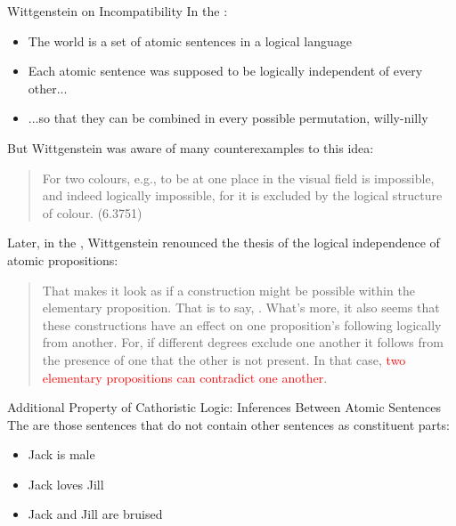 \begin{frame}{Wittgenstein on Incompatibility}
In the :
\begin{itemize}
\item
The world is a set of atomic sentences in a logical language
\item
Each atomic sentence was supposed to be logically independent of every other...
\item
...so that they can be combined in every possible permutation, willy-nilly
\end{itemize}
\end{frame}

\begin{frame}
But Wittgenstein was aware of many counterexamples to this idea:
\begin{quote}
For two colours, e.g., to be at one place in the visual field is impossible, and indeed logically impossible, for it is excluded by the logical structure of colour. (6.3751)
\end{quote}
\end{frame}

\begin{frame}
Later, in the , Wittgenstein renounced the thesis of the logical independence of atomic propositions:
\begin{quote}
That makes it look as if a construction might be possible within the elementary proposition. That is to say, . What's more, it also seems that these constructions have an effect on one proposition's following logically from another. For, if different degrees exclude one another it follows from the presence of one that the other is not present. In that case, \textcolor{red}{two elementary propositions can contradict one another}.
\end{quote}
\end{frame}



\begin{frame}{Additional Property of Cathoristic Logic: Inferences Between Atomic Sentences}
The  are those sentences that do not contain other sentences as constituent parts:
\begin{itemize}
\item
Jack is male
\item
Jack loves Jill
\item
Jack and Jill are bruised
\end{itemize}
\end{frame}

